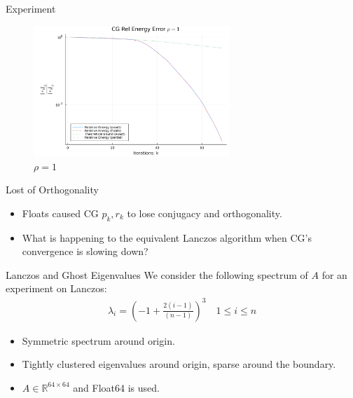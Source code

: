 \documentclass{beamer}
\begin{document}
    \begin{frame}{Experiment}
        \begin{figure}
            \centering
            \includegraphics[width=20em]{cg_convergence_1.png}
            \caption{$\rho = 1$}
        \end{figure}
    \end{frame}
    \begin{frame}{Lost of Orthogonality}
        \begin{itemize}
            \item Floats caused CG $p_k, r_k$ to lose conjugacy and orthogonality. 
            \item What is happening to the equivalent Lanczos algorithm when CG's convergence is slowing down?
        \end{itemize}
    \end{frame}
    \begin{frame}{Lanczos and Ghost Eigenvalues}
        We consider the following spectrum of $A$ for an experiment on Lanczos: 
        \begin{align}
            \lambda_i = \left(-1 + \frac{2(i - 1)}{(n - 1)}\right)^3
            \quad 1\le i \le n
        \end{align}\label{eqn:the_ill_conditioned_matrix}
        \begin{itemize}
            \item Symmetric spectrum around origin. 
            \item Tightly clustered eigenvalues around origin, sparse around the boundary. 
            \item $A\in \mathbb R^{64 \times 64}$ and Float64 is used. 
        \end{itemize}
    \end{frame}
\end{document}
